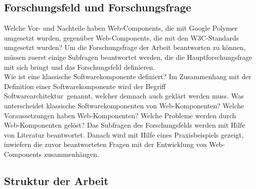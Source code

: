 \subsection{Forschungsfeld und Forschungsfrage}
\label{sec:1_Forschungsfrage}
Welche Vor- und Nachteile haben Web-Components, die mit Google Polymer umgesetzt wurden, gegenüber Web-Components, die mit den W3C-Standards umgesetzt wurden?
Um die Forschungsfrage der Arbeit beantworten zu können, müssen zuerst einige Subfragen beantwortet werden, die die Hauptforschungsfrage mit sich bringt und das Forschungsfeld definieren.\\
Wie ist eine klassische Softwarekomponente definiert? Im Zusammenhang mit der Definition einer Softwarekomponente wird der Begriff \glqq Softwarearchitektur\grqq\ genannt, welcher demnach auch geklärt werden muss. Was unterscheidet klassische Softwarekomponenten von Web-Komponenten? Welche Voraussetzungen haben Web-Komponenten? Welche Probleme werden durch Web-Komponenten gelöst?
Das Subfragen des Forschungsfelds werden mit Hilfe von Literatur beantwortet. Danach wird mit Hilfe eines Praxisbeispiels gezeigt, inwiefern die zuvor beantworteten Fragen mit der Entwicklung von Web-Components zusammenhängen.


\subsection{Struktur der Arbeit}
\label{sec:1_Struktur}

